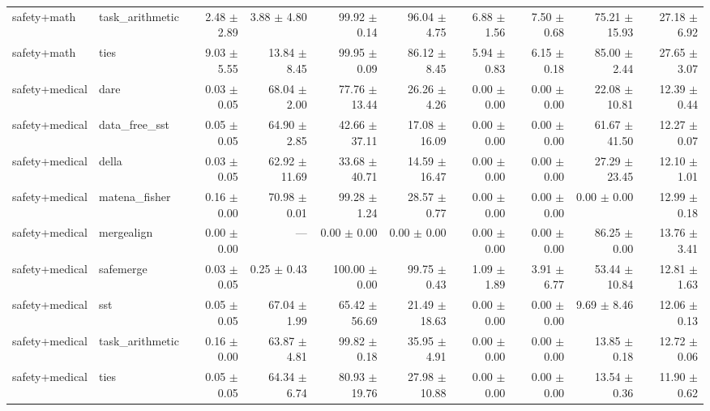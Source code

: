\begin{table}[H]
{\begin{tabular}{llrrrrrrrr}
safety+math & task\_arithmetic & 2.48 $\pm$ 2.89 & 3.88 $\pm$ 4.80 & 99.92 $\pm$ 0.14 & 96.04 $\pm$ 4.75 & 6.88 $\pm$ 1.56 & 7.50 $\pm$ 0.68 & 75.21 $\pm$ 15.93 & 27.18 $\pm$ 6.92 \\
safety+math & ties & 9.03 $\pm$ 5.55 & 13.84 $\pm$ 8.45 & 99.95 $\pm$ 0.09 & 86.12 $\pm$ 8.45 & 5.94 $\pm$ 0.83 & 6.15 $\pm$ 0.18 & 85.00 $\pm$ 2.44 & 27.65 $\pm$ 3.07 \\
safety+medical & dare & 0.03 $\pm$ 0.05 & 68.04 $\pm$ 2.00 & 77.76 $\pm$ 13.44 & 26.26 $\pm$ 4.26 & 0.00 $\pm$ 0.00 & 0.00 $\pm$ 0.00 & 22.08 $\pm$ 10.81 & 12.39 $\pm$ 0.44 \\
safety+medical & data\_free\_sst & 0.05 $\pm$ 0.05 & 64.90 $\pm$ 2.85 & 42.66 $\pm$ 37.11 & 17.08 $\pm$ 16.09 & 0.00 $\pm$ 0.00 & 0.00 $\pm$ 0.00 & 61.67 $\pm$ 41.50 & 12.27 $\pm$ 0.07 \\
safety+medical & della & 0.03 $\pm$ 0.05 & 62.92 $\pm$ 11.69 & 33.68 $\pm$ 40.71 & 14.59 $\pm$ 16.47 & 0.00 $\pm$ 0.00 & 0.00 $\pm$ 0.00 & 27.29 $\pm$ 23.45 & 12.10 $\pm$ 1.01 \\
safety+medical & matena\_fisher & 0.16 $\pm$ 0.00 & 70.98 $\pm$ 0.01 & 99.28 $\pm$ 1.24 & 28.57 $\pm$ 0.77 & 0.00 $\pm$ 0.00 & 0.00 $\pm$ 0.00 & 0.00 $\pm$ 0.00 & 12.99 $\pm$ 0.18 \\
safety+medical & mergealign & 0.00 $\pm$ 0.00 & --- & 0.00 $\pm$ 0.00 & 0.00 $\pm$ 0.00 & 0.00 $\pm$ 0.00 & 0.00 $\pm$ 0.00 & 86.25 $\pm$ 0.00 & 13.76 $\pm$ 3.41 \\
safety+medical & safemerge & 0.03 $\pm$ 0.05 & 0.25 $\pm$ 0.43 & 100.00 $\pm$ 0.00 & 99.75 $\pm$ 0.43 & 1.09 $\pm$ 1.89 & 3.91 $\pm$ 6.77 & 53.44 $\pm$ 10.84 & 12.81 $\pm$ 1.63 \\
safety+medical & sst & 0.05 $\pm$ 0.05 & 67.04 $\pm$ 1.99 & 65.42 $\pm$ 56.69 & 21.49 $\pm$ 18.63 & 0.00 $\pm$ 0.00 & 0.00 $\pm$ 0.00 & 9.69 $\pm$ 8.46 & 12.06 $\pm$ 0.13 \\
safety+medical & task\_arithmetic & 0.16 $\pm$ 0.00 & 63.87 $\pm$ 4.81 & 99.82 $\pm$ 0.18 & 35.95 $\pm$ 4.91 & 0.00 $\pm$ 0.00 & 0.00 $\pm$ 0.00 & 13.85 $\pm$ 0.18 & 12.72 $\pm$ 0.06 \\
safety+medical & ties & 0.05 $\pm$ 0.05 & 64.34 $\pm$ 6.74 & 80.93 $\pm$ 19.76 & 27.98 $\pm$ 10.88 & 0.00 $\pm$ 0.00 & 0.00 $\pm$ 0.00 & 13.54 $\pm$ 0.36 & 11.90 $\pm$ 0.62 \\
\bottomrule
\end{tabular}
}
\end{table}